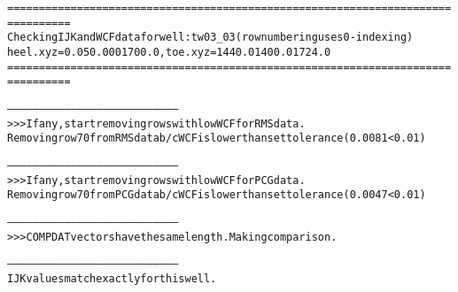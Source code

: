 \begin{alltt}
================================================================================
Checking IJK and WCF data for well: tw03_03 (row numbering uses 0-indexing)
heel.xyz =  0.05 0.000 1700.0, toe.xyz = 1440.0 1400.0 1724.0
================================================================================

--------------------------------------------------------------------------------
>>> If any, start removing rows with low WCF for RMS data.
Removing row 70 from RMS data b/c WCF is lower than set tolerance (0.0081 < 0.01)

--------------------------------------------------------------------------------
>>> If any, start removing rows with low WCF for PCG data.
Removing row 70 from PCG data b/c WCF is lower than set tolerance (0.0047 < 0.01)

--------------------------------------------------------------------------------
>>> COMPDAT vectors have the same length. Making comparison.

--------------------------------------------------------------------------------
IJK values match exactly for this well.


\end{alltt}
